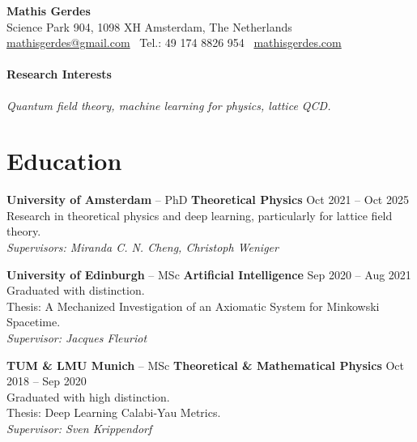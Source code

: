 \documentclass[11pt, letterpaper]{article}
\newcommand{\dateright}[1]{\hfill{\small\color{accentblue} #1}}
\begin{document}
\begin{center}
    {\LARGE \textbf{Mathis Gerdes}} \\
    \vspace{0.15cm}
    Science Park 904, 1098 XH Amsterdam, The Netherlands \\
    \href{mailto:mathisgerdes@gmail.com}{mathisgerdes@gmail.com} \textbullet\
    Tel.: \raisebox{0.2\height}{\footnotesize +}49 174 8826 954 \textbullet\
    \href{http://www.mathisgerdes.com}{mathisgerdes.com}
\end{center}

\vspace{0.4cm}

\paragraph{Research Interests}
\textit{Quantum field theory, machine learning for physics, lattice QCD.}

\section*{Education}
\noindent
\textbf{University of Amsterdam} -- PhD \textbf{Theoretical Physics} \dateright{Oct 2021 -- Oct 2025} \\
Research in theoretical physics and deep learning, particularly for lattice field theory. \\
\textit{Supervisors: Miranda C. N. Cheng, Christoph Weniger}

\vspace{0.2cm}

\noindent
\textbf{University of Edinburgh} -- MSc \textbf{Artificial Intelligence} \dateright{Sep 2020 -- Aug 2021} \\
Graduated with distinction. \\
Thesis: A Mechanized Investigation of an Axiomatic System for Minkowski Spacetime. \\
\textit{Supervisor: Jacques Fleuriot}

\vspace{0.2cm}

\noindent
\textbf{TUM \& LMU Munich} -- MSc \textbf{Theoretical \& Mathematical Physics} \dateright{Oct 2018 -- Sep 2020} \\
Graduated with high distinction. \\
Thesis: Deep Learning Calabi-Yau Metrics. \\
\textit{Supervisor: Sven Krippendorf}
\end{document}
